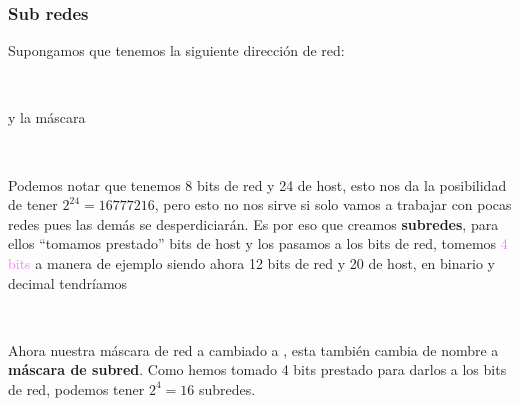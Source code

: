 \documentclass[
	12pt, %
	fleqn, %
	a4paper, %
	oneside, %
]{LegrandOrangeBook}
\begin{document}
\subsubsection{Sub redes}
Supongamos que tenemos la siguiente dirección de red:
\begin{center}
\\
\end{center}
y la máscara\\
\begin{center}
\\
\end{center}
Podemos notar que tenemos 8 bits de red y 24 de host, esto nos da la posibilidad de tener $2^24=16 777 216$, pero esto no nos sirve si solo vamos a trabajar con pocas redes pues las demás se desperdiciarán. Es por eso que creamos \textbf{subredes}, para ellos ``tomamos prestado'' bits de host y los pasamos a los bits de red, tomemos \textcolor{violet}{4 bits} a manera de ejemplo siendo ahora 12 bits de red y 20 de host, en binario y decimal tendríamos\\
\begin{center}
\\
\end{center}
Ahora nuestra máscara de red a cambiado a , esta también cambia de nombre a \textbf{máscara de subred}. Como hemos tomado 4 bits prestado para darlos a los bits de red, podemos tener $2^4=16$ subredes.
\end{document}
